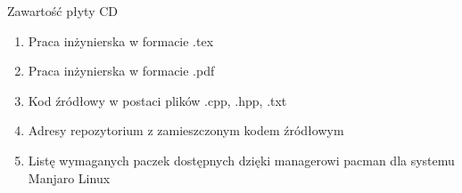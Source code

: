 \cleardoublepage
{}
\thispagestyle{plain}

{}

Zawartość płyty CD
\begin{enumerate}
\item Praca inżynierska w formacie .tex
\item Praca inżynierska w formacie .pdf
\item Kod źródłowy w postaci plików .cpp, .hpp, .txt
\item Adresy repozytorium z zamieszczonym kodem źródłowym
\item Listę wymaganych paczek dostępnych dzięki managerowi pacman dla systemu Manjaro Linux
\end{enumerate}

\restoregeometry
\makeatother
